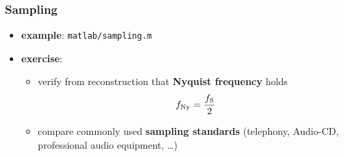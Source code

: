 \begin{frame} %
	\frametitle{Sampling}
	\begin{itemize}
		\item \textbf{example}: \texttt{matlab/sampling.m}
			\begin{figure}
				\centering
				\begin{subfigure}[c]{0.48\linewidth}
				\end{subfigure}
				\hspace{0.01\linewidth}
				\begin{subfigure}[c]{0.48\linewidth}
				\end{subfigure}
			\end{figure}
		\item \textbf{exercise}:
			\begin{itemize}
				\item verify from reconstruction that \textbf{Nyquist frequency} holds
					\begin{align*}
						f_{\textrm{Ny}}=\frac{f_{\textrm S}}2
					\end{align*}
				\item compare commonly used \textbf{sampling standards} (telephony, Audio-CD, professional audio equipment, \ldots)
			\end{itemize}
	\end{itemize}
\end{frame}

